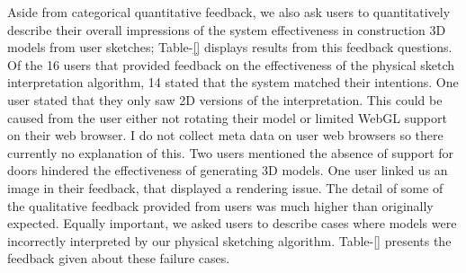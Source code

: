Aside from categorical quantitative feedback, we also ask users to quantitatively describe their overall impressions of the system effectiveness in construction 3D models from user sketches; 
Table-\ref{} displays results from this feedback questions.
Of the 16 users that provided feedback on the effectiveness of the physical sketch interpretation algorithm, 14 stated that the system matched their intentions.
One user stated that they only saw 2D versions of the interpretation.
This could be caused from the user either not rotating their model or limited WebGL support on their web browser.
I do  not collect meta data on user web browsers so there currently no explanation of this.
Two users mentioned the absence of support for doors hindered the effectiveness of generating 3D models.
One user linked us an image in their feedback, that displayed a rendering issue.
The detail of some of the qualitative feedback provided from users was much higher than originally expected.
Equally important, we asked users to describe cases where models were incorrectly interpreted by our physical sketching algorithm.
Table-\ref{} presents the feedback given about these failure cases.


































